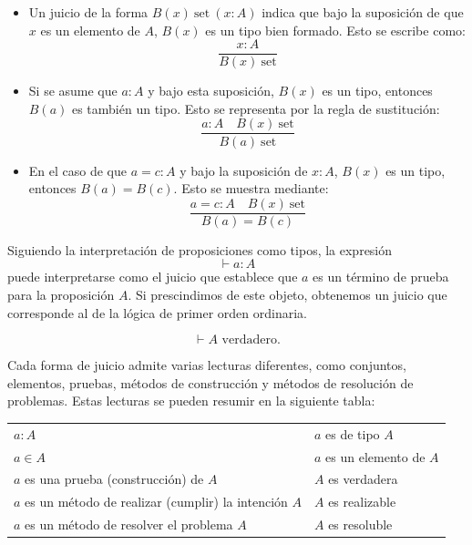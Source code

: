 \documentclass[11pt,oneside]{report}
\theoremstyle{plain}
\theoremstyle{definition}
\begin{document}
\begin{itemize}
  \item Un juicio de la forma \(B(x) \ \text{set} \ (x : A)\) indica que bajo la suposición de que \(x\) es un elemento de \(A\), \(B(x)\) es un tipo bien formado. Esto se escribe como:
  \[
  \frac{x : A}{B(x) \ \text{set}}
  \]
  
  \item Si se asume que \(a : A\) y bajo esta suposición, \(B(x)\) es un tipo, entonces \(B(a)\) es también un tipo. Esto se representa por la regla de sustitución:
  \[
  \frac{a : A \quad B(x) \ \text{set}}{B(a) \ \text{set}}
  \]
  
  \item En el caso de que \(a = c : A\) y bajo la suposición de \(x : A\), \(B(x)\) es un tipo, entonces \(B(a) = B(c)\). Esto se muestra mediante:
  \[
  \frac{a = c : A \quad B(x) \ \text{set}}{B(a) = B(c)}
  \]
\end{itemize}

Siguiendo la interpretación de proposiciones como tipos, la expresión
\begin{equation}
\vdash a:A
\end{equation}
puede interpretarse como el juicio que establece que \(a\) es un término de prueba para la proposición \(A\). Si prescindimos de este objeto, obtenemos un juicio que corresponde al de la lógica de primer orden ordinaria.

\begin{equation}
    \vdash A \text{ verdadero}.
\end{equation}

Cada forma de juicio admite varias lecturas diferentes, como conjuntos, elementos, pruebas, métodos de construcción y métodos de resolución de problemas. Estas lecturas se pueden resumir en la siguiente tabla:

\begin{center}
    \begin{tabular}{ll}
        \hline
        \(a : A\) & \(a\) es de tipo \(A\) \\
        \(a \in A\) & \(a\) es un elemento de \(A\) \\
        \(a\) es una prueba (construcción) de \(A\) & \(A\) es verdadera \\
        \(a\) es un método de realizar (cumplir) la intención \(A\) & \(A\) es realizable \\
        \(a\) es un método de resolver el problema \(A\) & \(A\) es resoluble \\
        \hline
    \end{tabular}
\end{center}
\end{document}
